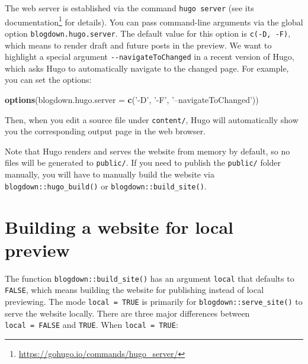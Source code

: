 \documentclass[12pt,]{krantz}
\makeatletter
\newenvironment{Shaded}{\begin{snugshade}}{\end{snugshade}}
\newcommand{\DataTypeTok}[1]{\textcolor[rgb]{0.13,0.29,0.53}{#1}}
\newcommand{\KeywordTok}[1]{\textcolor[rgb]{0.13,0.29,0.53}{\textbf{#1}}}
\newcommand{\NormalTok}[1]{#1}
\newcommand{\StringTok}[1]{\textcolor[rgb]{0.31,0.60,0.02}{#1}}
\renewcommand{\href}[2]{#2\footnote{\url{#1}}}
\newenvironment{kframe}{%
\medskip{}
\setlength{\fboxsep}{.8em}
 \def\at@end@of@kframe{}%
 \ifinner\ifhmode%
  \def\at@end@of@kframe{\end{minipage}}%
  \begin{minipage}{\columnwidth}%
 \fi\fi%
 \def\FrameCommand##1{\hskip\@totalleftmargin \hskip-\fboxsep
 \colorbox{shadecolor}{##1}\hskip-\fboxsep
     \hskip-\linewidth \hskip-\@totalleftmargin \hskip\columnwidth}%
 \MakeFramed {\advance\hsize-\width
   \@totalleftmargin\z@ \linewidth\hsize
   \@setminipage}}%
 {\par\unskip\endMakeFramed%
 \at@end@of@kframe}
\renewenvironment{Shaded}{\begin{kframe}}{\end{kframe}}
\theoremstyle{definition}
\theoremstyle{definition}
\theoremstyle{definition}
\theoremstyle{remark}
\makeatother
\begin{document}
The web server is established via the command \texttt{hugo\ server} (see
\href{https://gohugo.io/commands/hugo_server/}{its documentation} for
details). You can pass command-line arguments via the global option
\texttt{blogdown.hugo.server}. The default value for this option is
\texttt{c(\textquotesingle{}-D\textquotesingle{},\ \textquotesingle{}-F\textquotesingle{})},
which means to render draft and future posts in the preview. We want to
highlight a special argument \texttt{-\/-navigateToChanged} in a recent
version of Hugo, which asks Hugo to automatically navigate to the
changed page. For example, you can set the options:

\begin{Shaded}
\begin{Highlighting}[]
\KeywordTok{options}\NormalTok{(}\DataTypeTok{blogdown.hugo.server =} \KeywordTok{c}\NormalTok{(}\StringTok{'-D'}\NormalTok{, }\StringTok{'-F'}\NormalTok{, }\StringTok{'--navigateToChanged'}\NormalTok{))}
\end{Highlighting}
\end{Shaded}

Then, when you edit a source file under \texttt{content/}, Hugo will
automatically show you the corresponding output page in the web browser.

Note that Hugo renders and serves the website from memory by default, so
no files will be generated to \texttt{public/}. If you need to publish
the \texttt{public/} folder manually, you will have to manually build
the website via \texttt{blogdown::hugo\_build()} or
\texttt{blogdown::build\_site()}.

\hypertarget{local-preview}{%
\section{Building a website for local preview}\label{local-preview}}

The function
\texttt{blogdown::build\_site()} has an argument \texttt{local} that
defaults to \texttt{FALSE}, which means building the website for
publishing instead of local previewing. The mode \texttt{local\ =\ TRUE}
is primarily for \texttt{blogdown::serve\_site()} to serve the website
locally. There are three major differences between
\texttt{local\ =\ FALSE} and \texttt{TRUE}. When
\texttt{local\ =\ TRUE}:
\end{document}

